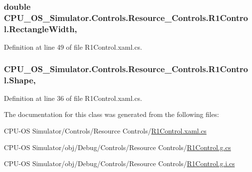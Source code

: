 \subsubsection[{Rectangle\+Width}]{\setlength{\rightskip}{0pt plus 5cm}double C\+P\+U\+\_\+\+O\+S\+\_\+\+Simulator.\+Controls.\+Resource\+\_\+\+Controls.\+R1\+Control.\+Rectangle\+Width\hspace{0.3cm}{\ttfamily [get]}, {\ttfamily [set]}}\label{class_c_p_u___o_s___simulator_1_1_controls_1_1_resource___controls_1_1_r1_control_a48842db3fde07b0bc2080d1778f5d744}


Definition at line 49 of file R1\+Control.\+xaml.\+cs.

\hypertarget{class_c_p_u___o_s___simulator_1_1_controls_1_1_resource___controls_1_1_r1_control_a700f297e01c70f960fde694275f61250}{}
\subsubsection[{Shape}]{ C\+P\+U\+\_\+\+O\+S\+\_\+\+Simulator.\+Controls.\+Resource\+\_\+\+Controls.\+R1\+Control.\+Shape\hspace{0.3cm}{\ttfamily [get]}, {\ttfamily [set]}}\label{class_c_p_u___o_s___simulator_1_1_controls_1_1_resource___controls_1_1_r1_control_a700f297e01c70f960fde694275f61250}


Definition at line 36 of file R1\+Control.\+xaml.\+cs.



The documentation for this class was generated from the following files\+:\begin{DoxyCompactItemize}
\item 
C\+P\+U-\/\+O\+S Simulator/\+Controls/\+Resource Controls/\hyperlink{_r1_control_8xaml_8cs}{R1\+Control.\+xaml.\+cs}\item 
C\+P\+U-\/\+O\+S Simulator/obj/\+Debug/\+Controls/\+Resource Controls/\hyperlink{_r1_control_8g_8cs}{R1\+Control.\+g.\+cs}\item 
C\+P\+U-\/\+O\+S Simulator/obj/\+Debug/\+Controls/\+Resource Controls/\hyperlink{_r1_control_8g_8i_8cs}{R1\+Control.\+g.\+i.\+cs}\end{DoxyCompactItemize}
